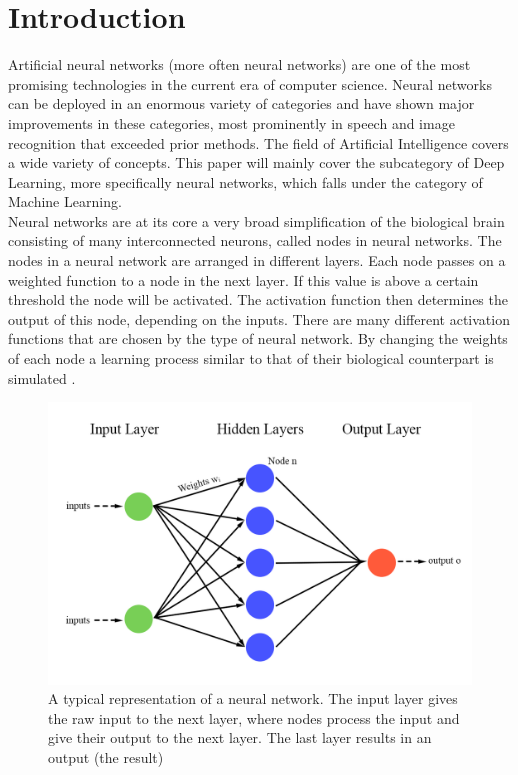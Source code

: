 \documentclass[conference]{IEEEtran}
\begin{document}
	\section{Introduction}
	Artificial neural networks (more often neural networks) are one of the most promising technologies in the current era of computer science. Neural networks can be deployed in an enormous variety of categories and have shown major improvements in these categories, most prominently in speech and image recognition \cite{speech_recognition1} that exceeded prior methods. The field of Artificial Intelligence covers a wide variety of concepts. This paper will mainly cover the subcategory of Deep Learning, more specifically neural networks, which falls under the category of Machine Learning. 
	\\
	Neural networks are at its core a very broad simplification of the biological brain consisting of many interconnected neurons, called nodes in neural networks. The nodes in a neural network are   arranged in different layers. Each node passes on a weighted function to a node in the next layer. If this value is above a certain threshold the node will be activated. The activation function then determines the output of this node, depending on the inputs. There are many different activation functions that are chosen by the type of neural network. By changing the weights of each node a learning process similar to that of their biological counterpart is simulated \cite{nn_basics}.
	\begin{figure}[h]
		\centering
		\includegraphics[width=\linewidth]{pictures/neuralnetwork.png}
		\caption{A typical representation of a neural network. The input layer gives the raw input to the next layer, where nodes process the input and give their output to the next layer. The last layer results in an output (the result)}
	\end{figure}
\end{document}

